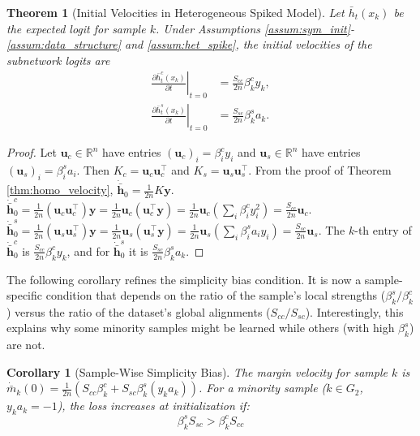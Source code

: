 \documentclass[letter,11pt]{article}
\newtheorem{theorem}{Theorem}
\newtheorem{corollary}{Corollary}
\begin{document}
\begin{theorem}[Initial Velocities in Heterogeneous Spiked Model]\label{thm:global_velocity}
    Let $\bar{h}_t(x_k)$ be the expected logit for sample $k$. Under Assumptions \ref{assum:sym_init}-\ref{assum:data_structure} and \ref{assum:het_spike}, the initial velocities of the subnetwork logits are
    \begin{equation}
    \begin{aligned}
    \left.\frac{\partial \bar{h}_t^c(x_k)}{\partial t}\right|_{t=0}
    &= \frac{S_{cc}}{2n} \beta^c_k y_k, \\
    \left.\frac{\partial \bar{h}_t^s(x_k)}{\partial t}\right|_{t=0}
    &= \frac{S_{sc}}{2n} \beta^s_k a_k.
    \end{aligned}
    \end{equation}
\end{theorem}
\begin{proof}
    Let $\mathbf{u}_c \in \mathbb{R}^n$ have entries $(\mathbf{u}_c)_i = \beta^c_i y_i$ and $\mathbf{u}_s \in \mathbb{R}^n$ have entries $(\mathbf{u}_s)_i = \beta^s_i a_i$. Then $K_c = \mathbf{u}_c \mathbf{u}_c^\top$ and $K_s = \mathbf{u}_s \mathbf{u}_s^\top$.
    From the proof of Theorem \ref{thm:homo_velocity}, $\dot{\bar{\mathbf{h}}}_0 = \frac{1}{2n} K \mathbf{y}$.
    $\dot{\bar{\mathbf{h}}}^c_0 = \frac{1}{2n} (\mathbf{u}_c \mathbf{u}_c^\top) \mathbf{y} = \frac{1}{2n} \mathbf{u}_c (\mathbf{u}_c^\top \mathbf{y}) = \frac{1}{2n} \mathbf{u}_c (\sum_i \beta^c_i y_i^2) = \frac{S_{cc}}{2n} \mathbf{u}_c$.
    $\dot{\bar{\mathbf{h}}}^s_0 = \frac{1}{2n} (\mathbf{u}_s \mathbf{u}_s^\top) \mathbf{y} = \frac{1}{2n} \mathbf{u}_s (\mathbf{u}_s^\top \mathbf{y}) = \frac{1}{2n} \mathbf{u}_s (\sum_i \beta^s_i a_i y_i) = \frac{S_{sc}}{2n} \mathbf{u}_s$.
    The $k$-th entry of $\dot{\bar{\mathbf{h}}}^c_0$ is $\frac{S_{cc}}{2n} \beta^c_k y_k$, and for $\dot{\bar{\mathbf{h}}}^s_0$ it is $\frac{S_{sc}}{2n} \beta^s_k a_k$.
\end{proof}

The following corollary refines the simplicity bias condition. It is now a sample-specific condition that depends on the ratio of the sample's local strengths ($\beta^s_k / \beta^c_k$) versus the ratio of the dataset's global alignments ($S_{cc} / S_{sc}$). Interestingly, this explains why some minority samples might be learned while others (with high $\beta^s_k$) are not.
\begin{corollary}[Sample-Wise Simplicity Bias]\label{cor:global_bias_condition}
    The margin velocity for sample $k$ is $\dot{\bar{m}}_k(0) = \frac{1}{2n} (S_{cc} \beta^c_k + S_{sc} \beta^s_k (y_k a_k))$.
    For a minority sample ($k \in G_2$, $y_k a_k = -1$), the loss increases at initialization if:
    \begin{equation}
        \beta^s_k S_{sc} > \beta^c_k S_{cc}
    \end{equation}
\end{corollary}
\end{document}
